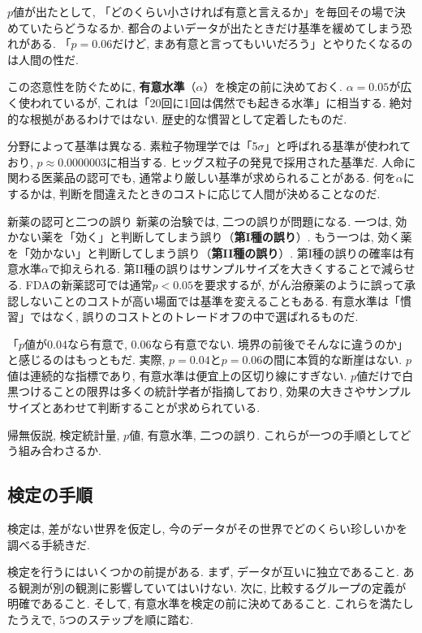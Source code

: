     $p$値が出たとして, 「どのくらい小さければ有意と言えるか」を毎回その場で決めていたらどうなるか.
    都合のよいデータが出たときだけ基準を緩めてしまう恐れがある.
    「$p = 0.06$だけど, まあ有意と言ってもいいだろう」とやりたくなるのは人間の性だ.

    この恣意性を防ぐために, \textbf{有意水準}（$\alpha$）を検定の前に決めておく.
    $\alpha = 0.05$が広く使われているが, これは「20回に1回は偶然でも起きる水準」に相当する.
    絶対的な根拠があるわけではない.
    歴史的な慣習として定着したものだ.

    分野によって基準は異なる.
    素粒子物理学では「5$\sigma$」と呼ばれる基準が使われており, $p \approx 0.0000003$に相当する.
    ヒッグス粒子の発見で採用された基準だ.
    人命に関わる医薬品の認可でも, 通常より厳しい基準が求められることがある.
    何を$\alpha$にするかは, 判断を間違えたときのコストに応じて人間が決めることなのだ.

    \begin{mybox}{新薬の認可と二つの誤り}
      新薬の治験では, 二つの誤りが問題になる.
      一つは, 効かない薬を「効く」と判断してしまう誤り（\textbf{第I種の誤り}）.
      もう一つは, 効く薬を「効かない」と判断してしまう誤り（\textbf{第II種の誤り}）.
      第I種の誤りの確率は有意水準$\alpha$で抑えられる.
      第II種の誤りはサンプルサイズを大きくすることで減らせる.
      FDAの新薬認可では通常$p < 0.05$を要求するが,
      がん治療薬のように誤って承認しないことのコストが高い場面では基準を変えることもある.
      有意水準は「慣習」ではなく, 誤りのコストとのトレードオフの中で選ばれるものだ.
    \end{mybox}

    「$p$値が0.04なら有意で, 0.06なら有意でない. 境界の前後でそんなに違うのか」と感じるのはもっともだ.
    実際, $p = 0.04$と$p = 0.06$の間に本質的な断崖はない.
    $p$値は連続的な指標であり, 有意水準は便宜上の区切り線にすぎない.
    $p$値だけで白黒つけることの限界は多くの統計学者が指摘しており,
    効果の大きさやサンプルサイズとあわせて判断することが求められている.

    帰無仮説, 検定統計量, $p$値, 有意水準, 二つの誤り.
    これらが一つの手順としてどう組み合わさるか.


  \subsection{検定の手順}

    検定は, 差がない世界を仮定し, 今のデータがその世界でどのくらい珍しいかを調べる手続きだ.

    検定を行うにはいくつかの前提がある.
    まず, データが互いに独立であること. ある観測が別の観測に影響していてはいけない.
    次に, 比較するグループの定義が明確であること.
    そして, 有意水準を検定の前に決めてあること.
    これらを満たしたうえで, 5つのステップを順に踏む.

